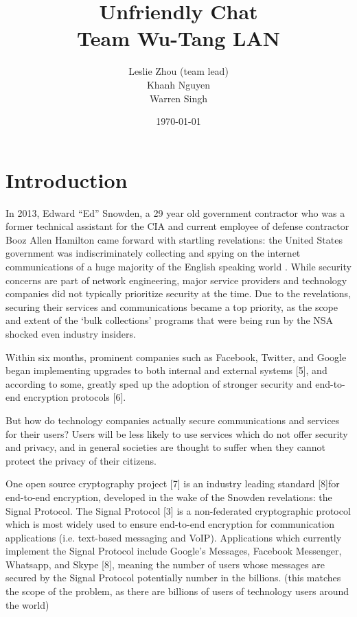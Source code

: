 \documentclass[12pt]{article}
\title{%
    Unfriendly Chat\\
    \large Team Wu-Tang LAN}
\author{Leslie Zhou (team lead)\\ Khanh Nguyen \\ Warren Singh}
\date{\today}
\begin{document}
\maketitle

\newpage
\tableofcontents
\newpage

\section{Introduction}
In 2013, Edward “Ed” Snowden, a 29 year old government contractor who was a former technical assistant for the CIA and current employee of defense contractor Booz Allen Hamilton came forward with startling revelations: the United States government was indiscriminately collecting and spying on the internet communications of a huge majority of the English speaking world \parencite{website:snowden}. While security concerns are part of network engineering, major service providers and technology companies did not typically prioritize security at the time. Due to the revelations, securing their services and communications became a top priority, as the scope and extent of the ‘bulk collections’ programs that were being run by the NSA shocked even industry insiders.
\par Within six months, prominent companies such as Facebook, Twitter, and Google began implementing upgrades to both internal and external systems [5], and according to some, greatly sped up the adoption of stronger security and end-to-end encryption protocols [6]. 

\par %
But how do technology companies actually secure communications and services for their users? Users will be less likely to use services which do not offer security and privacy, and in general societies are thought to suffer when they cannot protect the privacy of their citizens. 
\par One open source cryptography project [7] is an industry leading standard [8]for end-to-end encryption, developed in the wake of the Snowden revelations: the Signal Protocol. The Signal Protocol [3] is a non-federated cryptographic protocol which is most widely used to ensure end-to-end encryption for communication applications (i.e. text-based messaging and VoIP). Applications which currently implement the Signal Protocol include Google’s Messages, Facebook Messenger, Whatsapp, and Skype [8], meaning the number of users whose messages are secured by the Signal Protocol potentially number in the billions. (this matches the scope of the problem, as there are billions of users of technology users around the world)
\end{document}
